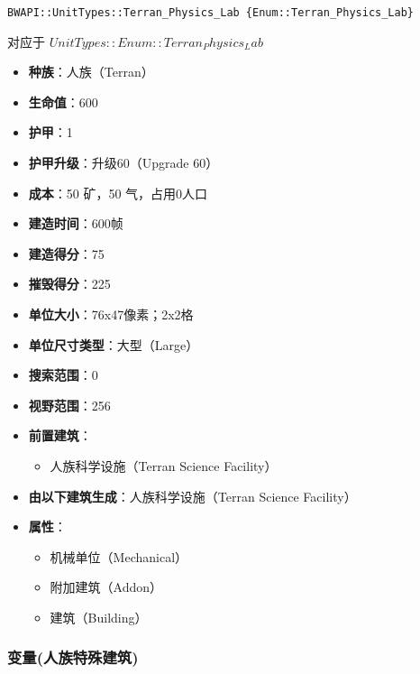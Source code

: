 \begin{tcolorbox}[colback=white, colframe=black!60!white, title=Terran\_Physics\_Lab(), arc=0mm]
    \begin{verbatim}
BWAPI::UnitTypes::Terran_Physics_Lab {Enum::Terran_Physics_Lab}
    \end{verbatim}
    对应于  $ UnitTypes::Enum::Terran_Physics_Lab $ 
    \begin{itemize}
        \item \textbf{种族}：人族（Terran）
        \item \textbf{生命值}：600
        \item \textbf{护甲}：1
        \item \textbf{护甲升级}：升级60（Upgrade 60）
        \item \textbf{成本}：50 矿，50 气，占用0人口
        \item \textbf{建造时间}：600帧
        \item \textbf{建造得分}：75
        \item \textbf{摧毁得分}：225
        \item \textbf{单位大小}：76x47像素；2x2格
        \item \textbf{单位尺寸类型}：大型（Large）
        \item \textbf{搜索范围}：0
        \item \textbf{视野范围}：256
        \item \textbf{前置建筑}：
            \begin{itemize}
                \item 人族科学设施（Terran Science Facility）
            \end{itemize}
        \item \textbf{由以下建筑生成}：人族科学设施（Terran Science Facility）
        \item \textbf{属性}：
            \begin{itemize}
                \item 机械单位（Mechanical）
                \item 附加建筑（Addon）
                \item 建筑（Building）
            \end{itemize}
    \end{itemize}
\end{tcolorbox}

\subsubsection{变量(人族特殊建筑)}

